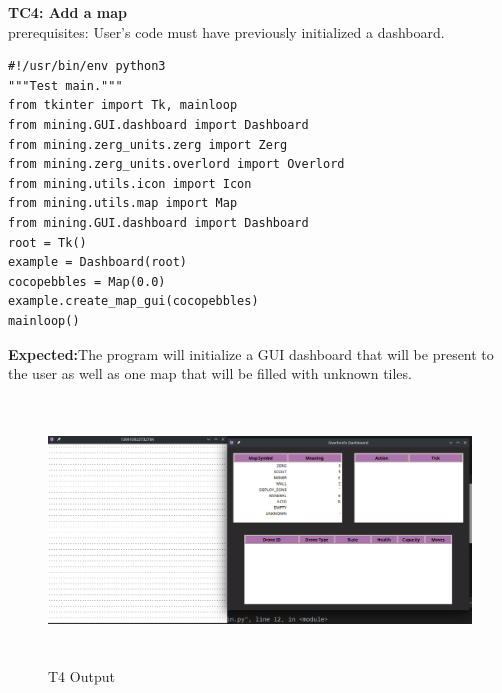 \documentclass{article}
\begin{document}
\newpage
\Large\textbf{TC4: Add a map}\\
\indent\large{prerequisites: User's code must have previously initialized a dashboard.}\\
\begin{lstlisting}
#!/usr/bin/env python3
"""Test main."""
from tkinter import Tk, mainloop
from mining.GUI.dashboard import Dashboard
from mining.zerg_units.zerg import Zerg
from mining.zerg_units.overlord import Overlord
from mining.utils.icon import Icon
from mining.utils.map import Map
from mining.GUI.dashboard import Dashboard
root = Tk()
example = Dashboard(root)
cocopebbles = Map(0.0)
example.create_map_gui(cocopebbles)
mainloop()

\end{lstlisting}
\begin{description}
    \textbf{Expected:}{The program will initialize a GUI dashboard that will be present to the user as well as one map that will be filled with unknown tiles.}
    \begin{figure}[htp]
    \includegraphics[width=15cm, height=7cm]{testcase4.png}
    
    \caption{T4 Output}
    \label{fig:galaxy}
\end{figure}
\end{description}
\end{document}
